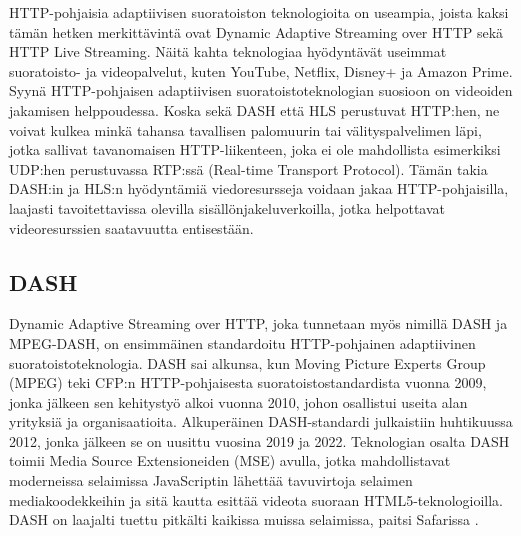 \documentclass[finnish, 12pt, a4paper, elec, utf8, a-1b, online]{aaltothesis}
\begin{document}
\begin{table}[htb]
  \caption{Esimerkki siitä, miltä Dynamic Adaptive Streaming over HTTP:n kaistanleveystikas voisi näyttää. \cite{Bitrate ladder} \label{taulukko4}}
  \centering
\end{table}

\noindent HTTP-pohjaisia adaptiivisen suoratoiston teknologioita on useampia, joista kaksi tämän hetken merkittävintä ovat Dynamic Adaptive Streaming over HTTP sekä HTTP Live Streaming. Näitä kahta teknologiaa hyödyntävät useimmat suoratoisto- ja videopalvelut, kuten YouTube, Netflix, Disney+ ja Amazon Prime. Syynä HTTP-pohjaisen adaptiivisen suoratoistoteknologian suosioon on videoiden jakamisen helppoudessa. Koska sekä DASH että HLS perustuvat HTTP:hen, ne voivat kulkea minkä tahansa tavallisen palomuurin tai välityspalvelimen läpi, jotka sallivat tavanomaisen HTTP-liikenteen, joka ei ole mahdollista esimerkiksi UDP:hen perustuvassa RTP:ssä (Real-time Transport Protocol). Tämän takia DASH:in ja HLS:n hyödyntämiä viedoresursseja voidaan jakaa HTTP-pohjaisilla, laajasti tavoitettavissa olevilla sisällönjakeluverkoilla, jotka helpottavat videoresurssien saatavuutta entisestään. \\

\subsection*{DASH}

Dynamic Adaptive Streaming over HTTP, joka tunnetaan myös nimillä DASH ja MPEG-DASH, on ensimmäinen standardoitu HTTP-pohjainen adaptiivinen suoratoistoteknologia. DASH sai alkunsa, kun Moving Picture Experts Group (MPEG) teki CFP:n HTTP-pohjaisesta suoratoistostandardista vuonna 2009, jonka jälkeen sen kehitystyö alkoi vuonna 2010, johon osallistui useita alan yrityksiä ja organisaatioita. Alkuperäinen DASH-standardi julkaistiin huhtikuussa 2012, jonka jälkeen se on uusittu vuosina 2019 ja 2022. Teknologian osalta DASH toimii Media Source Extensioneiden (MSE) avulla, jotka mahdollistavat moderneissa selaimissa JavaScriptin lähettää tavuvirtoja selaimen mediakoodekkeihin ja sitä kautta esittää videota suoraan HTML5-teknologioilla. DASH on laajalti tuettu pitkälti kaikissa muissa selaimissa, paitsi Safarissa \cite{Lambdatest}.
\end{document}
